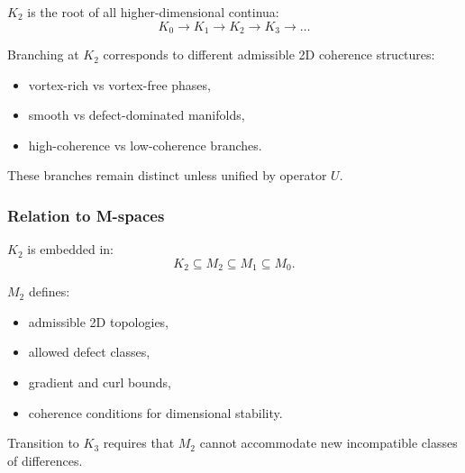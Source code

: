 $K_2$ is the root of all higher-dimensional continua:
\[
K_0 \to K_1 \to K_2 \to K_3 \to \dots
\]

Branching at $K_2$ corresponds to different admissible 2D coherence
structures:
\begin{itemize}
    \item vortex-rich vs vortex-free phases,
    \item smooth vs defect-dominated manifolds,
    \item high-coherence vs low-coherence branches.
\end{itemize}

These branches remain distinct unless unified by operator $U$.

\subsubsection{Relation to M-spaces}

$K_2$ is embedded in:
\[
K_2 \subseteq M_2 \subseteq M_1 \subseteq M_0.
\]

$M_2$ defines:
\begin{itemize}
    \item admissible 2D topologies,
    \item allowed defect classes,
    \item gradient and curl bounds,
    \item coherence conditions for dimensional stability.
\end{itemize}

Transition to $K_3$ requires that $M_2$ cannot accommodate new
incompatible classes of differences.
